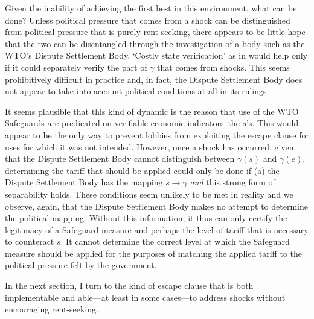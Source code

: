 \documentclass[12pt,titlepage]{article}
\newcommand{\ga}{\gamma}
\begin{document}
Given the inability of achieving the first best in this environment, what can be done? Unless political pressure that comes from a shock can be distinguished from political pressure that is purely rent-seeking, there appears to be little hope that the two can be disentangled through the investigation of a body such as the WTO's Dispute Settlement Body. `Costly state verification' as in \Textcite{bb} would help only if it could separately verify the part of $\ga$ that comes from shocks. This seems prohibitively difficult in practice and, in fact, the Dispute Settlement Body does not appear to take into account political conditions at all in its rulings.

It seems plausible that this kind of dynamic is the reason that use of the WTO Safeguards are predicated on verifiable economic indicators--the $s$'s. This would appear to be the only way to prevent lobbies from exploiting the escape clause for uses for which it was not intended. However, once a shock has occurred, given that the Dispute Settlement Body cannot distinguish between $\ga(s)$ and $\ga(e)$, determining the tariff that should be applied could only be done if (a) the Dispute Settlement Body has the mapping $s \rightarrow \ga$ \textit{and} this strong form of separability holds. These conditions seem unlikely to be met in reality and we observe, again, that the Dispute Settlement Body makes no attempt to determine the political mapping. Without this information, it thus can only certify the legitimacy of a Safeguard measure and perhaps the level of tariff that is necessary to counteract $s$. It cannot determine the correct level at which the Safeguard measure should be applied for the purposes of matching the applied tariff to the political pressure felt by the government.

In the next section, I turn to the kind of escape clause that is both implementable and able---at least in some cases---to address shocks without encouraging rent-seeking.
\end{document}
